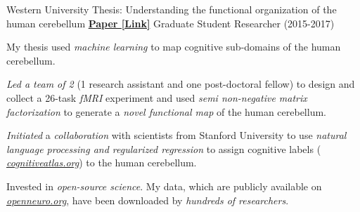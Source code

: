 \begin{cventries}
  \cventry
    {Western University} %
    {Thesis: Understanding the functional organization of the human cerebellum}
    {\href{http://ivrylab.berkeley.edu/uploads/4/1/1/5/41152143/functional_boundaries_in_the_human_cerebellum.pdf}{\textbf{Paper [Link]}}}
    {Graduate Student Researcher (2015-2017)} %
    {
      \begin{cvitems} %
        \item {My thesis used \textit{machine learning} to map cognitive sub-domains of the human cerebellum.}
      	\item {\textit{Led a team of 2} (1 research assistant and one post-doctoral fellow) to design and collect a 26-task \textit{fMRI} experiment and used \textit{semi non-negative matrix factorization} to generate a \textit{novel functional map} of the human cerebellum.}
      	\item {\textit{Initiated} a \textit{collaboration} with scientists from Stanford University to use \textit{natural language processing and regularized regression} to assign cognitive labels ( {\href{https://cognitiveatlas.org/}{\textit{cognitiveatlas.org}}}) to the human cerebellum.}
      	\item {Invested in \textit{open-source science}. My data, which are publicly available on {\href{https://openneuro.org/datasets/ds002105/versions/1.1.0}{\textit{openneuro.org}}}, have been downloaded by \textit{hundreds of researchers}.}
      \end{cvitems}
    }
\end{cventries}
